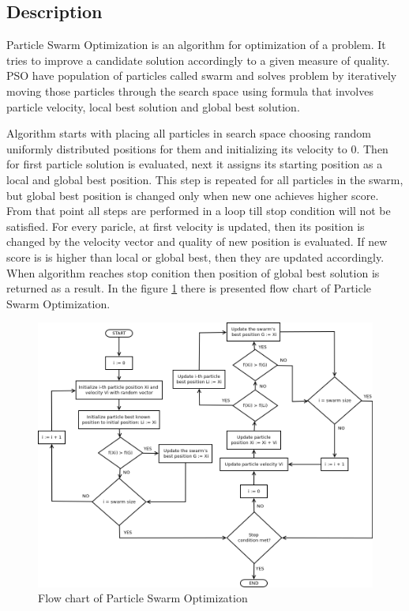 \subsection{Description}
Particle Swarm Optimization is an algorithm for optimization of a problem. It tries to improve a candidate solution 
accordingly to a given measure of quality. PSO have population of particles called swarm and solves problem by iteratively moving those particles 
through the search space using formula that involves particle velocity, local best solution and global best solution. 

Algorithm starts with placing all particles in search space choosing random uniformly distributed positions for them and initializing its velocity to 0. 
Then for first particle solution is evaluated, next it assigns its starting position as a local and global best position. 
This step is repeated for all particles in the swarm, but global best position is changed only when new one achieves higher score. 
From that point all steps are performed in a loop till stop condition will not be satisfied. For every paricle, at first 
velocity is updated, then its position is changed by the velocity vector and quality of new position is evaluated. 
If new score is is higher than local or global best, then they are updated accordingly. When algorithm reaches stop conition 
then position of global best solution is returned as a result.
In the figure \ref{pso_flowchart} there is presented flow chart of Particle Swarm Optimization.
\begin{figure}[ht]
    \centering
    \includegraphics[scale=0.4]{img/pso_flowchart.png}
    \caption{Flow chart of Particle Swarm Optimization}
    \label{pso_flowchart}
\end{figure}

